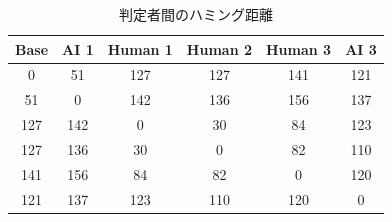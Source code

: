 \begin{table}[h]
\begin{center}
\caption{判定者間のハミング距離} \label{tab:diff}
\begin{tabular}{cccccc}
 {Base} & {AI 1} & {Human 1} & {Human 2} & {Human 3} & {AI 3} \\
\hline
 0 & 51 & 127 & 127 & 141 & 121 \\
 51 & 0 & 142 & 136 & 156 & 137 \\
 127 & 142 & 0 & 30 & 84 & 123 \\
 127 & 136 & 30 & 0 & 82 & 110 \\
 141 & 156 & 84 & 82 & 0 & 120 \\
 121 & 137 & 123 & 110 & 120 & 0 \\
\end{tabular}
\end{center}
\end{table}
